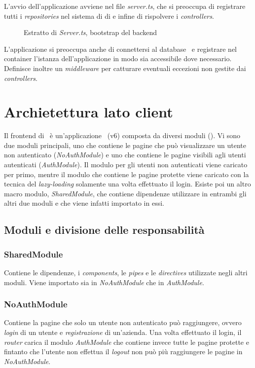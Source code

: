 L'avvio dell'applicazione avviene nel file \textit{server.ts}, che si preoccupa di registrare tutti i \textit{repositories} nel sistema di \acrlong{di} e infine di rispolvere i \textit{controllers}.
\begin{figure}[H] 
	\centering    
	
	\caption[Estratto di \textit{Server.ts}, bootstrap del \gls{backend}]{Estratto di \textit{Server.ts}, bootstrap del \gls{backend}}
	\label{fig:server-bootstrap}
\end{figure}

\noindent
L'applicazione si preoccupa anche di connettersi al database \mongodb~e registrare nel container l'istanza dell'applicazione in modo sia accessibile dove necessario. Definisce inoltre un \textit{middleware} per catturare eventuali eccezioni non gestite dai \textit{controllers}.

\pagebreak
\section{Archietettura lato client}

Il \gls{frontend} di \projectName~è un'applicazione \angular~(v6) composta da diversi moduli (). Vi sono due moduli principali, uno che contiene le pagine che può visualizzare un utente non autenticato (\textit{NoAuthModule}) e uno che contiene le pagine visibili agli utenti autenticati (\textit{AuthModule}). Il modulo per gli utenti non autenticati viene caricato per primo, mentre il modulo che contiene le pagine protette viene caricato con la tecnica del \textit{lazy-loading} solamente una volta effettuato il login. Esiste poi un altro macro modulo, \textit{SharedModule}, che contiene dipendenze utilizzare in entrambi gli altri due moduli e che viene infatti importato in essi.

\subsection{Moduli e divisione delle responsabilità}
\label{client:modules}
\subsubsection{SharedModule}
\label{client:shared-module}
Contiene le dipendenze, i \textit{components}, le \textit{pipes} e le \textit{directives} utilizzate negli altri moduli. Viene importato sia in \textit{NoAuthModule} che in \textit{AuthModule}.

\subsubsection{NoAuthModule}
\label{client:no-auth-module}
Contiene la pagine che solo un utente non autenticato può raggiungere, ovvero \textit{login} di un utente e \textit{registrazione} di un'azienda. Una volta effettuato il login, il \textit{router} carica il modulo \textit{AuthModule} che contiene invece tutte le pagine protette e fintanto che l'utente non effettua il \textit{logout} non può più raggiungere le pagine in \textit{NoAuthModule}.



